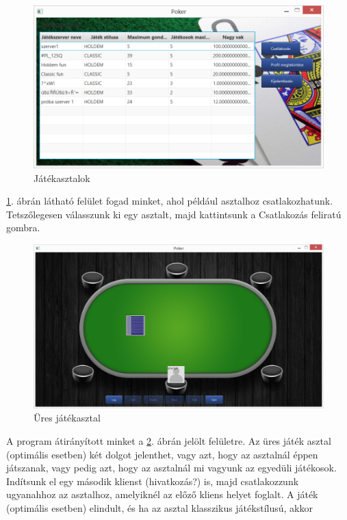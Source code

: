 \begin{figure}[h!]
  \caption{Játékasztalok}
  \label{fig:poker_tables}
  \centering
    \includegraphics[width=\textwidth]{user-documentation/images/tables.jpg}
\end{figure}
\ref{fig:poker_tables}. ábrán látható felület fogad minket, ahol például asztalhoz csatlakozhatunk. Tetszőlegesen válasszunk ki egy asztalt, majd kattintsunk a Csatlakozás feliratú gombra.
\begin{figure}[h!]
  \caption{Üres játékasztal}
  \label{fig:empty_table}
  \centering
    \includegraphics[width=\textwidth]{user-documentation/images/empty_table.jpg}
\end{figure}
A program átirányított minket a \ref{fig:empty_table}. ábrán jelölt felületre. Az üres játék asztal (optimális esetben) két dolgot jelenthet, vagy azt, hogy az asztalnál éppen játszanak, vagy pedig azt, hogy az asztalnál mi vagyunk az egyedüli játékosok. Indítsunk el egy második klienst (hivatkozás?) is, majd csatlakozzunk ugyanahhoz az asztalhoz, amelyiknél az előző kliens helyet foglalt. A játék (optimális esetben) elindult, és ha az asztal klasszikus játékstílusú, akkor
